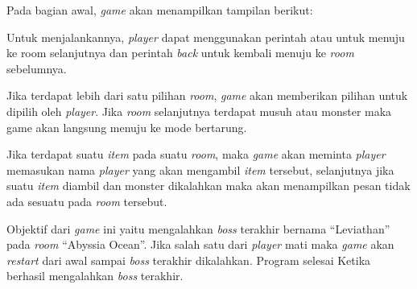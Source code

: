 \documentclass[../main.tex]{subfiles}
\begin{document}
Pada bagian awal, \textit{game} akan menampilkan tampilan berikut:


Untuk menjalankannya, \textit{player} dapat menggunakan perintah  atau  untuk menuju ke room selanjutnya dan perintah \textit{back} untuk kembali menuju ke \textit{room} sebelumnya.


Jika terdapat lebih dari satu pilihan \textit{room}, \textit{game} akan memberikan pilihan untuk dipilih oleh \textit{player}. Jika \textit{room} selanjutnya terdapat musuh atau monster maka game akan langsung menuju ke mode bertarung.


Jika terdapat suatu \textit{item} pada suatu \textit{room}, maka \textit{game} akan meminta \textit{player} memasukan nama \textit{player} yang akan mengambil \textit{item} tersebut, selanjutnya jika suatu \textit{item} diambil dan monster dikalahkan maka akan menampilkan pesan tidak ada sesuatu pada \textit{room} tersebut.


Objektif dari \textit{game} ini yaitu mengalahkan \textit{boss} terakhir bernama “Leviathan” pada \textit{room} “Abyssia Ocean”. Jika salah satu dari \textit{player} mati maka \textit{game} akan \textit{restart} dari awal sampai \textit{boss} terakhir dikalahkan. Program selesai Ketika berhasil mengalahkan \textit{boss} terakhir.
\end{document}

